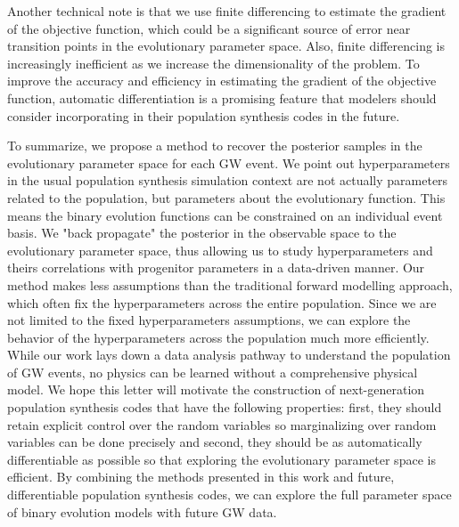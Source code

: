 \documentclass[linenumbers,twocolumn]{aastex631}
\begin{document}
Another technical note is that we use finite differencing to estimate the
gradient of the objective function, which could be a significant source of error
near transition points in the evolutionary parameter space. Also, finite
differencing is increasingly inefficient as we increase the dimensionality of
the problem. To improve the accuracy and efficiency in estimating the gradient
of the objective function, automatic differentiation is a promising feature that
modelers should consider incorporating in their population synthesis codes in
the future.


To summarize, we propose a method to recover the posterior samples in the evolutionary parameter space for each GW event.
We point out hyperparameters in the usual population synthesis simulation context are not actually parameters related to the population,
but parameters about the evolutionary function.
This means the binary evolution functions can be constrained on an individual event basis.
We "back propagate" the posterior in the observable space to the evolutionary parameter space,
thus allowing us to study hyperparameters and theirs correlations with progenitor parameters in a data-driven manner.
Our method makes less assumptions than the traditional forward modelling approach,
which often fix the hyperparameters across the entire population.
Since we are not limited to the fixed hyperparameters assumptions, we can explore the behavior of the hyperparameters across the population much more efficiently.
While our work lays down a data analysis pathway to understand the population of GW events,
no physics can be learned without a comprehensive physical model.
We hope this letter will motivate the construction of next-generation population synthesis codes that have the following properties:
first, they should retain explicit control over the random variables so marginalizing over random variables can be done precisely and
second, they should be as automatically differentiable as possible so that exploring the evolutionary parameter space is efficient.
By combining the methods presented in this work and future, differentiable population synthesis codes,
we can explore the full parameter space of binary evolution models with future GW data.
\end{document}
